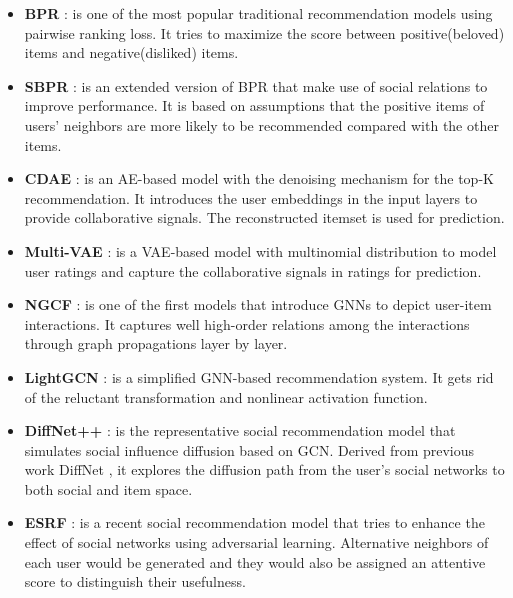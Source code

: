 \documentclass[letterpaper]{article} %
\begin{document}
\begin{itemize}
    \item \textbf{BPR} \cite{bpr}: is one of the most popular traditional recommendation models using pairwise ranking loss. It tries to maximize the score between positive(beloved) items and negative(disliked) items.
    \item \textbf{SBPR} \cite{sbpr}: is an extended version of BPR that make use of social relations to improve performance. It is based on assumptions that the positive items of users' neighbors are more likely to be recommended compared with the other items.
    \item \textbf{CDAE} \cite{cdae}: is an AE-based model with the denoising mechanism for the top-K recommendation. It introduces the user embeddings in the input layers to provide collaborative signals. The reconstructed itemset is used for prediction.
    \item \textbf{Multi-VAE} \cite{multivae}: is a VAE-based model with multinomial distribution to model user ratings and capture the collaborative signals in ratings for prediction.
    \item \textbf{NGCF} \cite{ngcf}: is one of the first models that introduce GNNs to depict user-item interactions. It captures well high-order relations among the interactions through graph propagations layer by layer.
    \item \textbf{LightGCN} \cite{lightgcn}: is a simplified GNN-based recommendation system. It gets rid of the reluctant transformation and nonlinear activation function.
    \item \textbf{DiffNet++} \cite{diffnet++}: is the representative social recommendation model that simulates social influence diffusion based on GCN. Derived from previous work DiffNet \cite{diffnet}, it explores the diffusion path from the user's social networks to both social and item space.
    \item \textbf{ESRF} \cite{ESRF}: is a recent social recommendation model that tries to enhance the effect of social networks using adversarial learning. Alternative neighbors of each user would be generated and they would also be assigned an attentive score to distinguish their usefulness.
\end{itemize}
\end{document}
